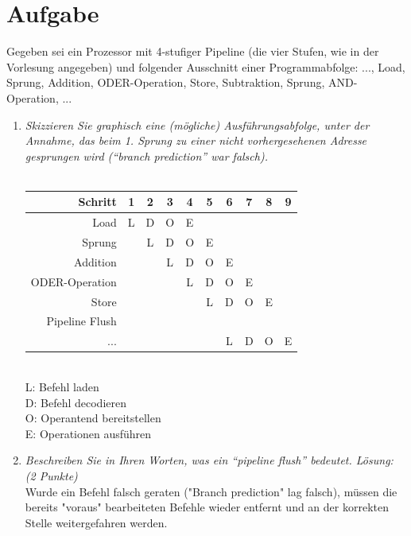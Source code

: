 \documentclass[10pt]{article}
\begin{document}
\section{Aufgabe}
Gegeben sei ein Prozessor mit 4-stufiger Pipeline (die vier Stufen, wie in der Vorlesung angegeben) und folgender Ausschnitt einer Programmabfolge: 
..., Load, Sprung, Addition, ODER-Operation, Store, Subtraktion, Sprung, AND-Operation, ...
\begin{enumerate}[label=\alph*)]
	\item 
	\textit{Skizzieren Sie graphisch eine (mögliche) Ausführungsabfolge, unter der Annahme, das beim 1. Sprung zu einer nicht vorhergesehenen Adresse gesprungen wird ("`branch prediction"' war falsch).} \\\\
	\begin{tabular}{r | c | c | c | c | c | c | c | c | c }
	Schritt & 1 & 2 & 3 & 4 & 5 & 6 & 7 & 8 & 9\\
	\hline
	Load		&	L	&	D	&	O	&	E	\\
	Sprung		&	&	L	&	D	&	O	& 	E 	\\
	Addition	&	&	&	L	&	D	&	O	&	E	\\
	ODER-Operation	&	&	&	&	L	&	D	&	O	&	E	\\
	Store	&	&	&	&	&	L	&	D	&	O	&	E	\\
	Pipeline Flush &	&	&	&	&	&	&	&	&\\
	...		&	&	&	&	&	&	L	&	D	&	O	&	E	\\
	\end{tabular}\\
	L: Befehl laden\\
	D: Befehl decodieren\\
	O: Operantend bereitstellen\\
	E: Operationen ausführen\\
	\item 
	\textit{Beschreiben Sie in Ihren Worten, was ein "`pipeline flush"' bedeutet. Lösung: (2 Punkte) } \\
	Wurde ein Befehl falsch geraten ("Branch prediction" lag falsch), müssen die bereits "voraus" bearbeiteten Befehle wieder entfernt und an der korrekten Stelle weitergefahren werden.
	
\end{enumerate}
\newpage

\end{document}
